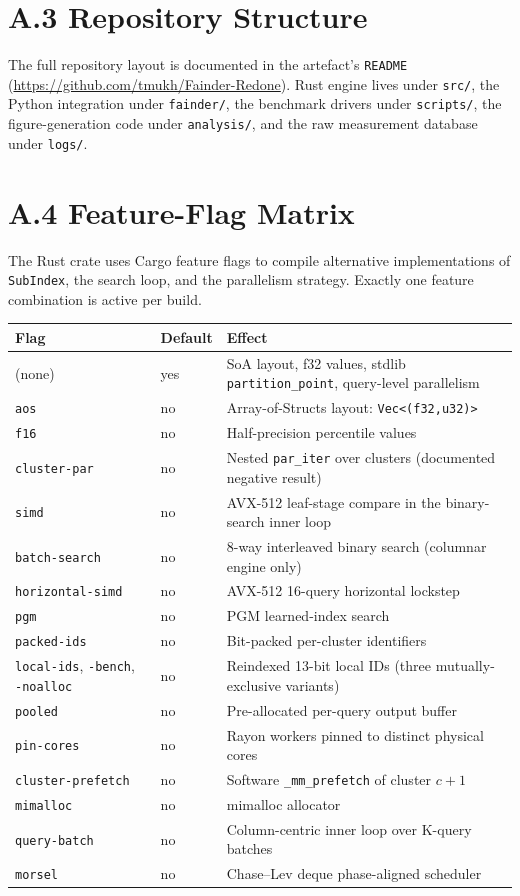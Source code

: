 \section*{A.3 Repository Structure}

The full repository layout is documented in the artefact's \texttt{README} (\url{https://github.com/tmukh/Fainder-Redone}). Rust engine lives under \texttt{src/}, the Python integration under \texttt{fainder/}, the benchmark drivers under \texttt{scripts/}, the figure-generation code under \texttt{analysis/}, and the raw measurement database under \texttt{logs/}.

\section*{A.4 Feature-Flag Matrix}

The Rust crate uses Cargo feature flags to compile alternative implementations of \texttt{SubIndex}, the search loop, and the parallelism strategy. Exactly one feature combination is active per build.

\footnotesize
\begin{tabular}{llp{7cm}}
  \toprule
  Flag & Default & Effect \\
  \midrule
  (none)         & yes & SoA layout, f32 values, stdlib \texttt{partition\_point}, query-level parallelism \\
  \texttt{aos}   & no  & Array-of-Structs layout: \texttt{Vec<(f32,u32)>} \\
  \texttt{f16}   & no  & Half-precision percentile values \\
  \texttt{cluster-par} & no & Nested \texttt{par\_iter} over clusters (documented negative result) \\
  \texttt{simd}  & no  & AVX-512 leaf-stage compare in the binary-search inner loop \\
  \texttt{batch-search} & no & 8-way interleaved binary search (columnar engine only) \\
  \texttt{horizontal-simd} & no & AVX-512 16-query horizontal lockstep \\
  \texttt{pgm}   & no  & PGM learned-index search \\
  \texttt{packed-ids} & no & Bit-packed per-cluster identifiers \\
  \texttt{local-ids}, \texttt{-bench}, \texttt{-noalloc} & no & Reindexed 13-bit local IDs (three mutually-exclusive variants) \\
  \texttt{pooled} & no & Pre-allocated per-query output buffer \\
  \texttt{pin-cores} & no & Rayon workers pinned to distinct physical cores \\
  \texttt{cluster-prefetch} & no & Software \texttt{\_mm\_prefetch} of cluster $c{+}1$ \\
  \texttt{mimalloc} & no & mimalloc allocator \\
  \texttt{query-batch} & no & Column-centric inner loop over K-query batches \\
  \texttt{morsel} & no & Chase--Lev deque phase-aligned scheduler \\
  \bottomrule
\end{tabular}

